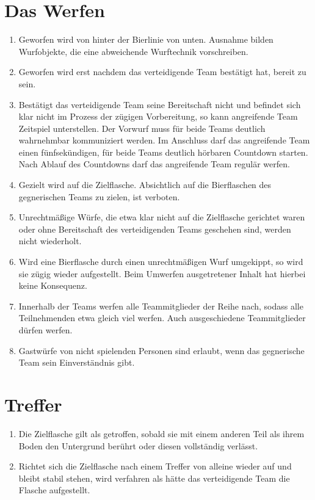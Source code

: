\section{Das Werfen}
\begin{enumerate}[label={(\arabic*)}]
    \item
    Geworfen wird von hinter der Bierlinie von unten.
    Ausnahme bilden Wurfobjekte, die eine abweichende Wurftechnik vorschreiben.

    \item
    Geworfen wird erst nachdem das verteidigende Team bestätigt hat, bereit zu sein.

    \item
    Bestätigt das verteidigende Team seine Bereitschaft nicht und befindet sich klar nicht im Prozess der zügigen Vorbereitung, so kann angreifende Team Zeitspiel unterstellen.
    Der Vorwurf muss für beide Teams deutlich wahrnehmbar kommuniziert werden.
    Im Anschluss darf das angreifende Team einen fünfsekündigen, für beide Teams deutlich hörbaren Countdown starten.
    Nach Ablauf des Countdowns darf das angreifende Team regulär werfen.

    \item
    Gezielt wird auf die Zielflasche.
    Absichtlich auf die Bierflaschen des gegnerischen Teams zu zielen, ist verboten.

    \item
    Unrechtmäßige Würfe, die etwa klar nicht auf die Zielflasche gerichtet waren oder ohne Bereitschaft des verteidigenden Teams geschehen sind, werden nicht wiederholt.

    \item
    Wird eine Bierflasche durch einen unrechtmäßigen Wurf umgekippt, so wird sie zügig wieder aufgestellt.
    Beim Umwerfen ausgetretener Inhalt hat hierbei keine Konsequenz.

    \item
    Innerhalb der Teams werfen alle Teammitglieder der Reihe nach, sodass alle Teilnehmenden etwa gleich viel werfen.
    Auch ausgeschiedene Teammitglieder dürfen werfen.

    \item
    Gastwürfe von nicht spielenden Personen sind erlaubt, wenn das gegnerische Team sein Einverständnis gibt.
\end{enumerate}

\section{Treffer}
\begin{enumerate}[label={(\arabic*)}]
    \item\label{Flunkyball:Treffer:Allg}
    Die Zielflasche gilt als getroffen, sobald sie mit einem anderen Teil als ihrem Boden den Untergrund berührt oder diesen vollständig verlässt.

    \item 
    Richtet sich die Zielflasche nach einem Treffer von alleine wieder auf und bleibt stabil stehen, wird verfahren als hätte das verteidigende Team die Flasche aufgestellt.
\end{enumerate}

